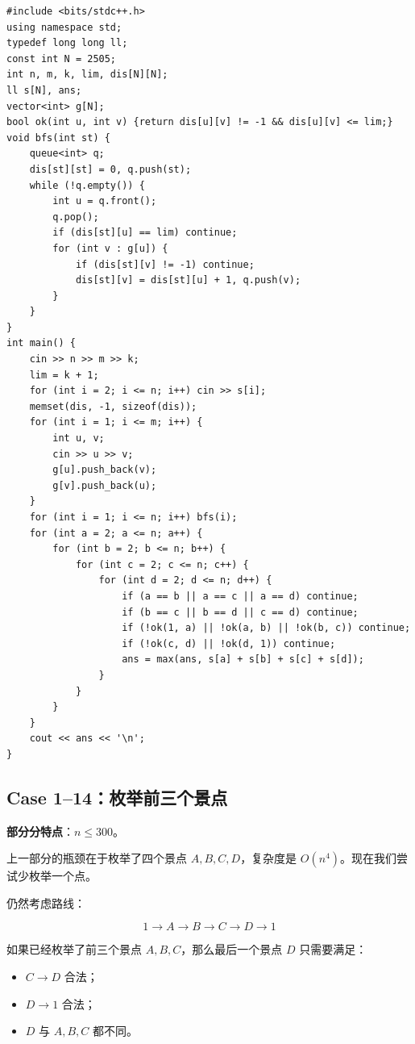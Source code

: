 \documentclass{book}
\begin{document}
\begin{lstlisting}[style = code]
#include <bits/stdc++.h>
using namespace std;
typedef long long ll;
const int N = 2505;
int n, m, k, lim, dis[N][N];
ll s[N], ans;
vector<int> g[N];
bool ok(int u, int v) {return dis[u][v] != -1 && dis[u][v] <= lim;}
void bfs(int st) {
    queue<int> q;
    dis[st][st] = 0, q.push(st);
    while (!q.empty()) {
        int u = q.front();
        q.pop();
        if (dis[st][u] == lim) continue;
        for (int v : g[u]) {
            if (dis[st][v] != -1) continue;
            dis[st][v] = dis[st][u] + 1, q.push(v);
        }
    }
}
int main() {
    cin >> n >> m >> k;
    lim = k + 1;
    for (int i = 2; i <= n; i++) cin >> s[i];
    memset(dis, -1, sizeof(dis));
    for (int i = 1; i <= m; i++) {
        int u, v;
        cin >> u >> v;
        g[u].push_back(v);
        g[v].push_back(u);
    }
    for (int i = 1; i <= n; i++) bfs(i);
    for (int a = 2; a <= n; a++) {
        for (int b = 2; b <= n; b++) {
            for (int c = 2; c <= n; c++) {
                for (int d = 2; d <= n; d++) {
                    if (a == b || a == c || a == d) continue;
                    if (b == c || b == d || c == d) continue;
                    if (!ok(1, a) || !ok(a, b) || !ok(b, c)) continue;
                    if (!ok(c, d) || !ok(d, 1)) continue;
                    ans = max(ans, s[a] + s[b] + s[c] + s[d]);
                }
            }
        }
    }
    cout << ans << '\n';
}
\end{lstlisting}

\subsection{Case 1--14：枚举前三个景点}

\textbf{部分分特点}：$n\le 300$。

上一部分的瓶颈在于枚举了四个景点 $A,B,C,D$，复杂度是 $O(n^4)$。现在我们尝试少枚举一个点。

仍然考虑路线：

$$
1\to A\to B\to C\to D\to 1
$$

如果已经枚举了前三个景点 $A,B,C$，那么最后一个景点 $D$ 只需要满足：

\begin{itemize}[leftmargin=2em,itemsep=1pt,topsep=2pt,parsep=0pt,partopsep=0pt]
    \item $C\to D$ 合法；
    \item $D\to 1$ 合法；
    \item $D$ 与 $A,B,C$ 都不同。
\end{itemize}
\end{document}
